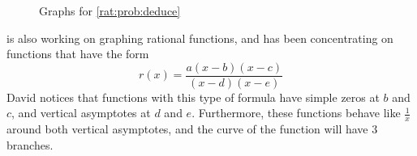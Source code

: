 \begin{exercises}
 \begin{figure}[!htb]
 	\begin{widepage}
 	\setlength{\figurewidth}{0.3\textwidth}
 	\begin{subfigure}{\figurewidth}
 		\caption{}
 		\label{rat:fig:deducecurve1}
 	\end{subfigure}%
 	\hfill
 	\begin{subfigure}{\figurewidth}
 		\caption{}
 		\label{rat:fig:deducecurve2}
 	\end{subfigure}%
 	\hfill
 	\begin{subfigure}{\figurewidth}
 		\caption{}
 		\label{rat:fig:deducecurve4}
 	\end{subfigure}
 	\caption{Graphs for \cref{rat:prob:deduce}}
 	\label{rat:fig:deducecurve}
 	\end{widepage}
 \end{figure}
    
 \begin{problem}\label{rat:prob:deducehard}
  is also working on graphing rational functions, and 
 has been concentrating on functions that have the form
 \[
 	r(x)=\frac{a(x-b)(x-c)}{(x-d)(x-e)}
 \]
 David notices that functions with this type of formula have simple zeros 
 at $b$ and $c$, and vertical asymptotes at $d$ and $e$. Furthermore, 
 these functions behave like $\frac{1}{x}$ around both vertical asymptotes,
 and the curve of the function will have $3$ branches. 
    

\end{problem}
\end{exercises}
